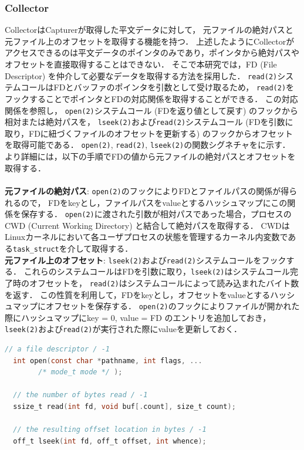 \subsubsection{Collector}
CollectorはCapturerが取得した平文データに対して，
元ファイルの絶対パスと元ファイル上のオフセットを取得する機能を持つ．
上述したようにCollectorがアクセスできるのは平文データのポインタのみであり，ポインタから絶対パスやオフセットを直接取得することはできない．
そこで本研究では，FD (File Descriptor) を仲介して必要なデータを取得する方法を採用した．
\texttt{read(2)}システムコールはFDとバッファのポインタを引数として受け取るため，
\texttt{read(2)}をフックすることでポインタとFDの対応関係を取得することができる．
この対応関係を参照し，
\texttt{open(2)}システムコール (FDを返り値として戻す) のフックから相対または絶対パスを，
\texttt{lseek(2)}および\texttt{read(2)}システムコール (FDを引数に取り，FDに紐づくファイルのオフセットを更新する) のフックからオフセットを取得可能である．
\texttt{open(2)}, \texttt{read(2)}, \texttt{lseek(2)}の関数シグネチャをに示す．
より詳細には，以下の手順でFDの値から元ファイルの絶対パスとオフセットを取得する．
\\
\\
\textbf{元ファイルの絶対パス}:
\texttt{open(2)}のフックによりFDとファイルパスの関係が得られるので，
FDをkeyとし，ファイルパスをvalueとするハッシュマップにこの関係を保存する．
\texttt{open(2)}に渡された引数が相対パスであった場合，プロセスのCWD (Current Working Directory) と結合して絶対パスを取得する．
CWDはLinuxカーネルにおいて各ユーザプロセスの状態を管理するカーネル内変数である\texttt{task\_struct}を介して取得する．
\\
\textbf{元ファイル上のオフセット}:
\texttt{lseek(2)}および\texttt{read(2)}システムコールをフックする．
これらのシステムコールはFDを引数に取り，\texttt{lseek(2)}はシステムコール完了時のオフセットを，
\texttt{read(2)}はシステムコールによって読み込まれたバイト数を返す．
この性質を利用して，FDをkeyとし，オフセットをvalueとするハッシュマップにオフセットを保存する．
\texttt{open(2)}のフックによりファイルが開かれた際にハッシュマップにkey = 0, value = FD のエントリを追加しておき，
\texttt{lseek(2)}および\texttt{read(2)}が実行された際にvalueを更新しておく．

\begin{lstlisting}[caption=Signatures of the related system calls. The comment lines indicate the return value on success / error., label=code:syscalls, language=C]
  // a file descriptor / -1
  int open(const char *pathname, int flags, ...
        /* mode_t mode */ );
        
  // the number of bytes read / -1
  ssize_t read(int fd, void buf[.count], size_t count);

  // the resulting offset location in bytes / -1
  off_t lseek(int fd, off_t offset, int whence);
\end{lstlisting}


